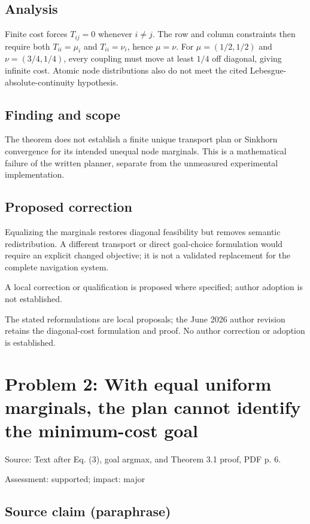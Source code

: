 \documentclass[11pt]{article}
\begin{document}
\subsection*{Analysis}

Finite cost forces \(T_{ij}=0\) whenever \(i\ne j\). The row and column constraints then require both \(T_{ii}=\mu_i\) and \(T_{ii}=\nu_i\), hence \(\mu=\nu\). For \(\mu=(1/2,1/2)\) and \(\nu=(3/4,1/4)\), every coupling must move at least \(1/4\) off diagonal, giving infinite cost. Atomic node distributions also do not meet the cited Lebesgue-absolute-continuity hypothesis.

\subsection*{Finding and scope}

The theorem does not establish a finite unique transport plan or Sinkhorn convergence for its intended unequal node marginals. This is a mathematical failure of the written planner, separate from the unmeasured experimental implementation.

\subsection*{Proposed correction}

Equalizing the marginals restores diagonal feasibility but removes semantic redistribution. A different transport or direct goal-choice formulation would require an explicit changed objective; it is not a validated replacement for the complete navigation system.

A local correction or qualification is proposed where specified; author adoption is not established.

The stated reformulations are local proposals; the June 2026 author revision retains the diagonal-cost formulation and proof. No author correction or adoption is established.

\section*{Problem 2: With equal uniform marginals, the plan cannot identify the minimum-cost goal}

Source: Text after Eq. (3), goal argmax, and Theorem 3.1 proof, PDF p. 6.

Assessment: supported; impact: major

\subsection*{Source claim (paraphrase)}
\end{document}
